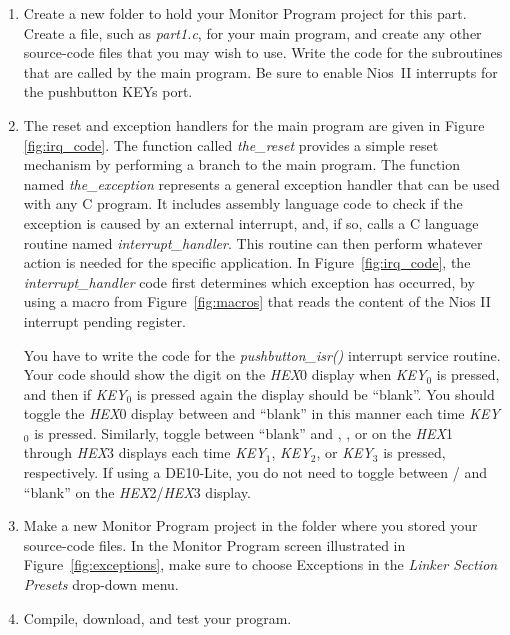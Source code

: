 \documentclass[epsfig,10pt,fullpage]{article}
\begin{document}
\begin{enumerate}
\item Create a new folder to hold your Monitor Program project for this part. Create a
file, such as {\it part1.c}, for your main program, and create any other source-code files 
that you may wish to use.  Write the code for the subroutines that are called by the 
main program. Be sure to enable Nios~II interrupts for the pushbutton KEYs port.

\item 
The reset and exception handlers for the main program are given in Figure \ref{fig:irq_code}. 
The function called {\it the\_reset} provides a simple reset mechanism by
performing a branch to the main program. The function named {\it the\_exception} 
represents a general exception handler that can be used with any C program. It includes 
assembly language code to check if the exception is caused by an external interrupt, and, 
if so, calls a C language routine named {\it interrupt\_handler}. This routine can then 
perform whatever action is needed for the specific application. In 
Figure~\ref{fig:irq_code}, the {\it interrupt\_handler} code first 
determines which exception has occurred, by using a macro from Figure~\ref{fig:macros} 
that reads the content of the Nios II interrupt pending register. 
  
\newpage
You have to write the code for the {\it pushbutton\_isr()} interrupt service routine.
Your code should show the digit  on the {\it HEX}0 display when {\it KEY}$_0$ is
pressed, and then if {\it KEY}$_0$ is pressed again the display should be ``blank''. You should
toggle the {\it HEX}0 display between  and ``blank'' in this manner each time 
{\it KEY}$_0$ is pressed. Similarly, toggle between ``blank'' and , , or 
 on the {\it HEX}1 through {\it HEX}3 displays each time {\it KEY}$_1$, {\it KEY}$_2$,
or {\it KEY}$_3$ is pressed, respectively. If using a DE10-Lite, you do not need to toggle between
/ and ``blank'' on the {\it HEX}2/{\it HEX}3 display.

\item
Make a new Monitor Program project in the folder where you stored your source-code files.
In the Monitor Program screen illustrated in Figure~\ref{fig:exceptions}, make sure 
to choose {\sf Exceptions} in the {\it Linker Section Presets} drop-down menu.

\item
Compile, download, and test your program. 
\end{enumerate}
\end{document}
